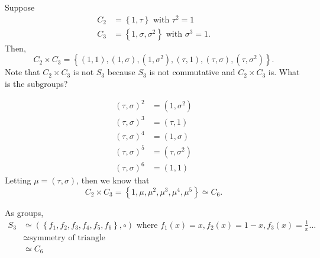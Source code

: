 \begin{eg}
    Suppose 
    \begin{align*}
        C_2 &= \left\{ 1, \tau  \right\} \text{ with } \tau ^2 = 1 \\
        C_3 &= \left\{ 1, \sigma , \sigma ^2 \right\} \text{ with } \sigma ^3 = 1.  
    \end{align*}
    Then, 
    \[
        C_2 \times C_3 = \left\{ (1, 1), (1, \sigma ), (1, \sigma ^2), (\tau ,1), (\tau , \sigma ), (\tau, \sigma^2) \right\}. 
    \]
    Note that \(C_2 \times C_3\) is not \(S_3\) because \(S_3\) is not commutative and \(C_2 \times C_3\) is. What is the subgroups?   
\end{eg}
\begin{explanation}
    \begin{align*}
        (\tau , \sigma )^2 &= (1, \sigma ^2) \\
        (\tau , \sigma )^3 &= (\tau ,1) \\
        (\tau , \sigma )^4 &= (1, \sigma ) \\
        (\tau , \sigma )^5 &= (\tau , \sigma ^2) \\
        (\tau , \sigma )^6 &= (1, 1)
    \end{align*}
    Letting \(\mu = (\tau , \sigma )\), then we know that 
    \[
        C_2 \times C_3 = \left\{ 1, \mu , \mu ^2, \mu ^3, \mu ^4, \mu ^5 \right\} \simeq  C_6. 
    \] 
\end{explanation}
As groups, 
\begin{align*}
    S_3 &\simeq \left( \left\{ f_1, f_2, f_3, f_4, f_5, f_6 \right\}, \circ  \right) \text{ where } f_1(x) = x, f_2(x) = 1-x, f_3(x) = \frac{1}{x} \dots \\
    &\simeq  \text{symmetry of triangle} \\
    &\simeq C_6
\end{align*}
